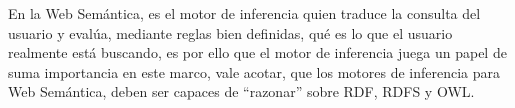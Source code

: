 En la Web Semántica, es el motor de inferencia quien traduce la consulta del usuario y evalúa, mediante reglas bien definidas, qué es lo que el usuario realmente está buscando, es por ello que el motor de inferencia juega un papel de suma importancia en este marco, vale acotar, que los motores de inferencia para Web Semántica, deben ser capaces de ``razonar'' sobre RDF, RDFS y OWL.

\newpage

